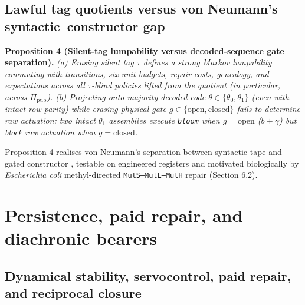 \documentclass[12pt,letterpaper]{article}
\begin{document}
\subsection{Lawful tag quotients versus von Neumann's
syntactic--constructor
gap}\label{lawful-tag-quotients-versus-von-neumanns-syntacticconstructor-gap}

\textbf{Proposition 4 (Silent-tag lumpability versus decoded-sequence
gate separation).} \emph{(a) Erasing silent tag \(\tau\) defines a
strong Markov lumpability \citep{burkeRosenblatt1958} commuting with
transitions, six-unit budgets, repair costs, genealogy, and expectations
across all \(\tau\)-blind policies lifted from the quotient (in
particular, across \(\Pi_{\mathrm{pub}}\)). (b) Projecting onto
majority-decoded code \(\theta \in \{\theta_0, \theta_1\}\) (even with
intact row parity) while erasing physical gate
\(g \in \{\mathrm{open}, \mathrm{closed}\}\) fails to determine raw
actuation: two intact \(\theta_1\) assemblies execute \texttt{bloom}
when \(g=\mathrm{open}\) (\(b+\gamma\)) but block raw actuation when
\(g=\mathrm{closed}\).}

Proposition 4 realises von Neumann's \citeyearpar{vonNeumann1966}
separation between syntactic tape and gated constructor
\citep{rosen1991, deacon2011}, testable on engineered registers and
motivated biologically by \emph{Escherichia coli} methyl-directed
\texttt{MutS–MutL–MutH} repair
\citep{auWelshModrich1992, hasanLeach2015} (Section 6.2).

\section{Persistence, paid repair, and diachronic
bearers}\label{persistence-paid-repair-and-diachronic-bearers}

\subsection{Dynamical stability, servocontrol, paid repair, and
reciprocal
closure}\label{dynamical-stability-servocontrol-paid-repair-and-reciprocal-closure}
\end{document}

